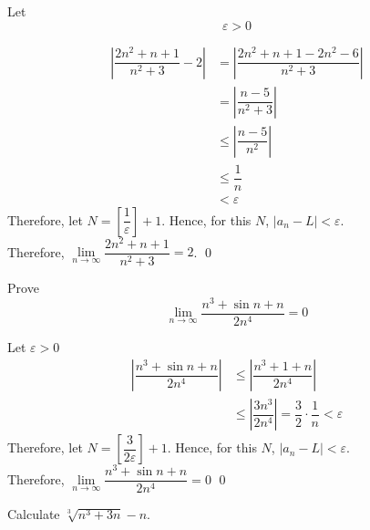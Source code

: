 \documentclass[fleqn, a4paper, 12pt, twoside]{article}
\theoremstyle{definition}
\theoremstyle{theorem}
\begin{document}
\begin{solution}[print]
	Let
	\begin{equation*}
		\varepsilon > 0
	\end{equation*}

	\begin{align*}
		\left| \dfrac{2n^2 + n + 1}{n^2 + 3} - 2 \right| &= \left| \dfrac{2n^2 + n + 1 - 2n^2 - 6}{n^2 + 3} \right|\\
		&= \left| \dfrac{n - 5}{n^2 + 3} \right| \\
		&\leq \left| \dfrac{n - 5}{n^2} \right|\\
		&\leq \dfrac{1}{n}\\
		&< \varepsilon
	\end{align*}
	Therefore, let $N = \left[ \dfrac{1}{\varepsilon} \right] + 1$.
	Hence, for this $N$, $|a_n - L| < \varepsilon$.\\
	Therefore, $\lim\limits_{n \to \infty} \dfrac{2n^2 + n + 1}{n^2 + 3} = 2$.
	\qed
\end{solution}

\begin{question}
	Prove
	\begin{equation*}
		\lim\limits_{n \to \infty} \dfrac{n^3 + \sin n + n}{2n^4} = 0
	\end{equation*}
\end{question}

\begin{solution}[print]
	Let $\varepsilon > 0$
	\begin{align*}
		\left| \dfrac{n^3 + \sin n + n}{2n^4} \right| &\leq \left| \dfrac{n^3 + 1 + n}{2n ^4} \right|\\
		&\leq \left| \dfrac{3n^3}{2n^4} \right| = \dfrac{3}{2} \cdot \dfrac{1}{n} < \varepsilon
	\end{align*}
	Therefore, let $N = \left[ \dfrac{3}{2 \varepsilon} \right] + 1$.
	Hence, for this $N$, $|a_n - L| < \varepsilon$.\\
	Therefore, $\lim\limits_{n \to \infty} \dfrac{n^3 + \sin n + n}{2n^4} = 0$
	\qed
\end{solution}

\begin{question}
	Calculate $\sqrt[3]{n^3 + 3n} - n$.
\end{question}
\end{document}
